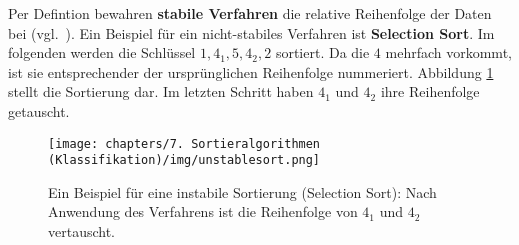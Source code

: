 Per Defintion bewahren \textbf{stabile Verfahren} die relative Reihenfolge der Daten bei (vgl.~\cite[170]{GD18e}). Ein Beispiel für ein nicht-stabiles Verfahren ist \textbf{Selection Sort}.
Im folgenden werden die Schlüssel $1, 4_1, 5, 4_2, 2$ sortiert.
Da die $4$ mehrfach vorkommt, ist sie entsprechender der ursprünglichen Reihenfolge nummeriert.
Abbildung \ref{fig:unstablesort} stellt die Sortierung dar.
Im letzten Schritt haben $4_1$ und $4_2$ ihre Reihenfolge getauscht.



\begin{figure}[h]
    \centering
    \texttt{[image: chapters/7. Sortieralgorithmen (Klassifikation)/img/unstablesort.png]}
    \caption{Ein Beispiel für eine instabile Sortierung (Selection Sort): Nach Anwendung des Verfahrens ist die Reihenfolge von $4_1$ und $4_2$ vertauscht.}
    \label{fig:unstablesort}
\end{figure}

